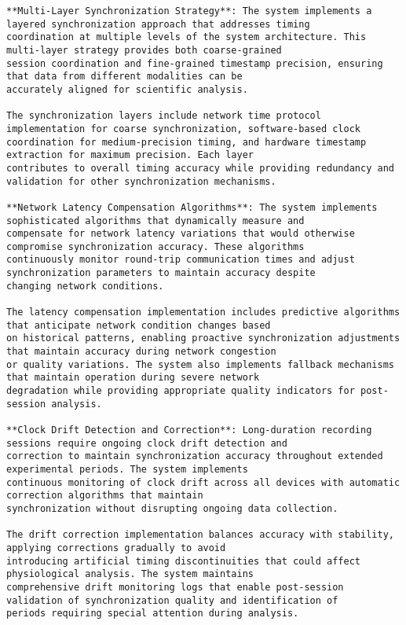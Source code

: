 \documentclass[12pt,a4paper]{report}
\begin{document}
\begin{verbatim}
**Multi-Layer Synchronization Strategy**: The system implements a layered synchronization approach that addresses timing
coordination at multiple levels of the system architecture. This multi-layer strategy provides both coarse-grained
session coordination and fine-grained timestamp precision, ensuring that data from different modalities can be
accurately aligned for scientific analysis.

The synchronization layers include network time protocol implementation for coarse synchronization, software-based clock
coordination for medium-precision timing, and hardware timestamp extraction for maximum precision. Each layer
contributes to overall timing accuracy while providing redundancy and validation for other synchronization mechanisms.

**Network Latency Compensation Algorithms**: The system implements sophisticated algorithms that dynamically measure and
compensate for network latency variations that would otherwise compromise synchronization accuracy. These algorithms
continuously monitor round-trip communication times and adjust synchronization parameters to maintain accuracy despite
changing network conditions.

The latency compensation implementation includes predictive algorithms that anticipate network condition changes based
on historical patterns, enabling proactive synchronization adjustments that maintain accuracy during network congestion
or quality variations. The system also implements fallback mechanisms that maintain operation during severe network
degradation while providing appropriate quality indicators for post-session analysis.

**Clock Drift Detection and Correction**: Long-duration recording sessions require ongoing clock drift detection and
correction to maintain synchronization accuracy throughout extended experimental periods. The system implements
continuous monitoring of clock drift across all devices with automatic correction algorithms that maintain
synchronization without disrupting ongoing data collection.

The drift correction implementation balances accuracy with stability, applying corrections gradually to avoid
introducing artificial timing discontinuities that could affect physiological analysis. The system maintains
comprehensive drift monitoring logs that enable post-session validation of synchronization quality and identification of
periods requiring special attention during analysis.


\end{verbatim}
\end{document}
